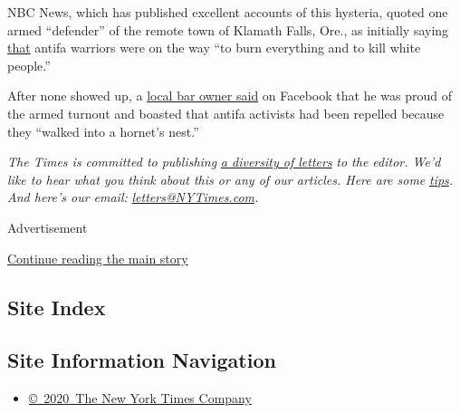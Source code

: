 NBC News, which has published excellent accounts of this hysteria,
quoted one armed ``defender'' of the remote town of Klamath Falls, Ore.,
as initially saying
\href{https://www.nbcnews.com/tech/social-media/klamath-falls-oregon-victory-declared-over-antifa-which-never-showed-n1226681}{that}
antifa warriors were on the way ``to burn everything and to kill white
people.''

After none showed up, a
\href{https://www.facebookcorewwwi.onion/BlackDogBilliards/posts/3317601008272149?__xts__\%5B0\%5D=68.ARBOw_sLf2jlK3QcCTbMRjrsJTqAsMSxNx2UukVmY45LyqrCuy-X0T0tuAzWSsdnOV4Gl-MnNgR0ecKIxudwgMoBoWWK47arRAtPcgWHMn4AcQPinPKrffW9bsP1FjDhSKqxq01XlrNi3GZxB4SAma4RZkpO3IFOD4MOetuQwe_zJmMJD6Q0G_gmG-4Vd5bRO-AeCt3lRIor1AxDVPKi8ZIkkDH6Px036y_wjw24tJ3p3GrWniT4pLzdM2O3RMBFze1PY5UXn0_wIpDizlYv2MlRIBtEz_gOWzZLCVPtqMqxm5Fb0Vmh4TmbRqd85BahF8uZkTxF2vcXYERo\&__tn__=H-R}{local
bar owner said} on Facebook that he was proud of the armed turnout and
boasted that antifa activists had been repelled because they ``walked
into a hornet's nest.''

\emph{The Times is committed to publishing}
\href{https://www.nytimes3xbfgragh.onion/2019/01/31/opinion/letters/letters-to-editor-new-york-times-women.html}{\emph{a
diversity of letters}} \emph{to the editor. We'd like to hear what you
think about this or any of our articles. Here are some}
\href{https://help.nytimes3xbfgragh.onion/hc/en-us/articles/115014925288-How-to-submit-a-letter-to-the-editor}{\emph{tips}}\emph{.
And here's our email:}
\href{mailto:letters@NYTimes.com}{\emph{letters@NYTimes.com}}\emph{.}

Advertisement

\protect\hyperlink{after-bottom}{Continue reading the main story}

\hypertarget{site-index}{%
\subsection{Site Index}\label{site-index}}

\hypertarget{site-information-navigation}{%
\subsection{Site Information
Navigation}\label{site-information-navigation}}

\begin{itemize}
\tightlist
\item
  \href{https://help.nytimes3xbfgragh.onion/hc/en-us/articles/115014792127-Copyright-notice}{©~2020~The
  New York Times Company}
\end{itemize}

